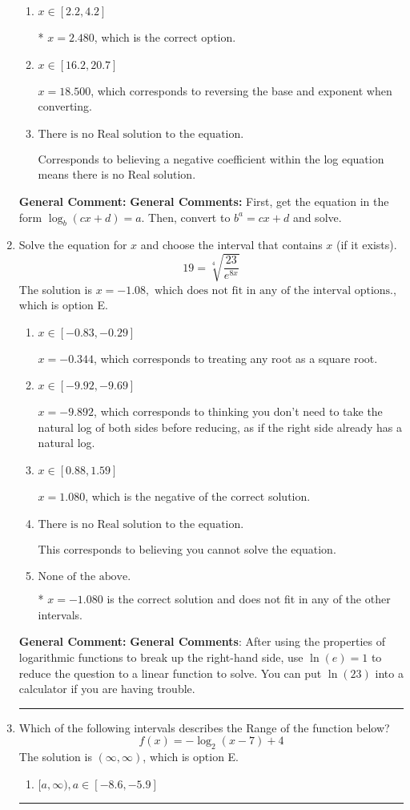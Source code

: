 \documentclass{extbook}[14pt]
\newcommand{\litem}[1]{\item #1

\rule{\textwidth}{0.4pt}}
\begin{document}
\begin{enumerate}
{\begin{enumerate}[label=\Alph*.]
$x = -10.000$, which corresponds to ignoring the vertical shift when converting to exponential form.
\item \( x \in [2.2, 4.2] \)

* $x = 2.480$, which is the correct option.
\item \( x \in [16.2, 20.7] \)

$x = 18.500$, which corresponds to reversing the base and exponent when converting.
\item \( \text{There is no Real solution to the equation.} \)

Corresponds to believing a negative coefficient within the log equation means there is no Real solution.
\end{enumerate}

\textbf{General Comment:} \textbf{General Comments:} First, get the equation in the form $\log_b{(cx+d)} = a$. Then, convert to $b^a = cx+d$ and solve.
}
\litem{
 Solve the equation for $x$ and choose the interval that contains $x$ (if it exists).
\[  19 = \sqrt[4]{\frac{23}{e^{8x}}} \]The solution is \( x = -1.08, \text{ which does not fit in any of the interval options.} \), which is option E.\begin{enumerate}[label=\Alph*.]
\item \( x \in [-0.83, -0.29] \)

$x = -0.344$, which corresponds to treating any root as a square root.
\item \( x \in [-9.92, -9.69] \)

$x = -9.892$, which corresponds to thinking you don't need to take the natural log of both sides before reducing, as if the right side already has a natural log.
\item \( x \in [0.88, 1.59] \)

$x = 1.080$, which is the negative of the correct solution.
\item \( \text{There is no Real solution to the equation.} \)

This corresponds to believing you cannot solve the equation.
\item \( \text{None of the above.} \)

* $x = -1.080$ is the correct solution and does not fit in any of the other intervals.
\end{enumerate}

\textbf{General Comment:} \textbf{General Comments}: After using the properties of logarithmic functions to break up the right-hand side, use $\ln(e) = 1$ to reduce the question to a linear function to solve. You can put $\ln(23)$ into a calculator if you are having trouble.
}
\litem{
Which of the following intervals describes the Range of the function below?
\[ f(x) = -\log_2{(x-7)}+4 \]The solution is \( (\infty, \infty) \), which is option E.\begin{enumerate}[label=\Alph*.]
\item \( [a, \infty), a \in [-8.6, -5.9] \)


\end{enumerate}}
\end{enumerate}
\end{document}
